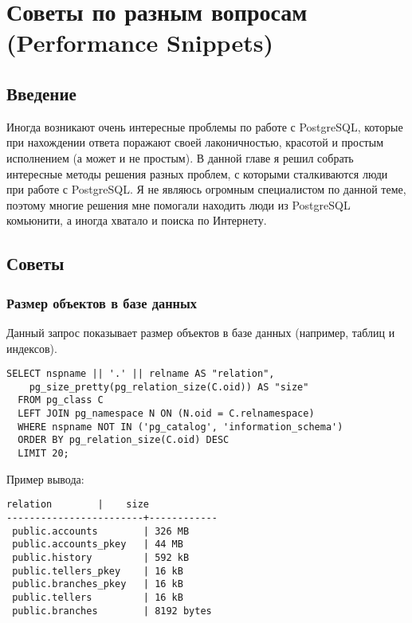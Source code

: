 \chapter{Советы по разным вопросам (Performance Snippets)}
\begin{epigraphs}
\end{epigraphs}

\section{Введение}
Иногда возникают очень интересные проблемы по работе с PostgreSQL, которые при нахождении ответа поражают своей лаконичностью,
красотой и простым исполнением (а может и не простым). В данной главе я решил собрать интересные методы решения разных проблем, с
которыми сталкиваются люди при работе с PostgreSQL. Я не являюсь огромным специалистом по данной теме, поэтому многие решения
мне помогали находить люди из PostgreSQL комьюнити, а иногда хватало и поиска по Интернету.

\section{Советы}

\subsection{Размер объектов в базе данных}
Данный запрос показывает размер объектов в базе данных (например, таблиц и индексов).

\begin{lstlisting}[label=lst:snippets1,title=snippets/biggest\_relations.sql]
SELECT nspname || '.' || relname AS "relation",
    pg_size_pretty(pg_relation_size(C.oid)) AS "size"
  FROM pg_class C
  LEFT JOIN pg_namespace N ON (N.oid = C.relnamespace)
  WHERE nspname NOT IN ('pg_catalog', 'information_schema')
  ORDER BY pg_relation_size(C.oid) DESC
  LIMIT 20;
\end{lstlisting}

Пример вывода:
\begin{lstlisting}[label=lst:snippets2,caption=Поиск самых больших объектов в БД. Пример вывода]
        relation        |    size
------------------------+------------
 public.accounts        | 326 MB
 public.accounts_pkey   | 44 MB
 public.history         | 592 kB
 public.tellers_pkey    | 16 kB
 public.branches_pkey   | 16 kB
 public.tellers         | 16 kB
 public.branches        | 8192 bytes
\end{lstlisting}

